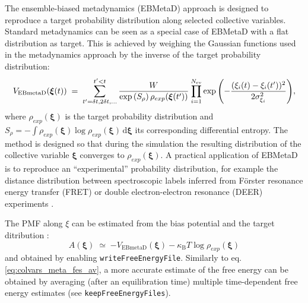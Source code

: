 The ensemble-biased metadynamics (EBMetaD) approach \cite{Marinelli2015} is designed to reproduce a target probability distribution along selected collective variables.
Standard metadynamics can be seen as a special case of EBMetaD with a flat distribution as target.
This is achieved by weighing the Gaussian functions used in the metadynamics approach by the inverse of the target probability distribution:
\begin{equation}
  \label{eq:colvars_ebmeta_pot}
  V_{\mathrm{EBmetaD}}({\mbox{\boldmath{$\xi$}}}(t)) \; = \; {
    \sum_{t' = \delta{}t, \\ 2\delta{}t, \\ \ldots}^{t'<t} \frac{W}{\exp\left(S_{\rho}\right)\rho_{exp}({\mbox{\boldmath{$\xi$}}}(t'))} \: {
      \prod_{i = 1}^{N_{\mathrm{cv}}}
      \exp\left(-\frac{(\xi_{i}(t)-\xi_{i}(t'))^{2}}{2\sigma_{\xi_{i}}^{2}}\right)
    }
  }\mathrm{,}
\end{equation}
where $\rho_{exp}(\bm{\xi})$ is the target probability distribution and $S_{\rho} = - \int  \rho_{exp}(\bm{\xi}) \log \rho_{exp}(\bm{\xi})  \, \mathrm{d}\bm{\xi}$ its corresponding differential entropy.
The method is designed so that during the simulation the resulting distribution of the collective variable $\bm{\xi}$ converges to $\rho_{exp}(\bm{\xi})$.
A practical application of EBMetaD is to reproduce an ``experimental'' probability distribution, for example the distance distribution between spectroscopic labels inferred from F\"orster resonance energy transfer (FRET) or double electron-electron resonance (DEER) experiments \cite{Marinelli2015}.

The PMF along $\xi$ can be estimated from the bias potential and the target ditribution \cite{Marinelli2015}:
\begin{equation}
  \label{eq:colvars_ebmeta_fes}
  A(\bm{\xi}) \; \simeq \; {
    -V_{\mathrm{EBmetaD}}(\bm{\xi}) - \kappa_{\mathrm{B}}T \log \rho_{exp}(\bm{\xi})
  }
\end{equation}
and obtained by enabling \texttt{writeFreeEnergyFile}.
Similarly to eq.{} \ref{eq:colvars_meta_fes_av}, a more accurate estimate of the free energy can be obtained by averaging (after an equilibration time) multiple time-dependent free energy estimates (see \texttt{keepFreeEnergyFiles}).

